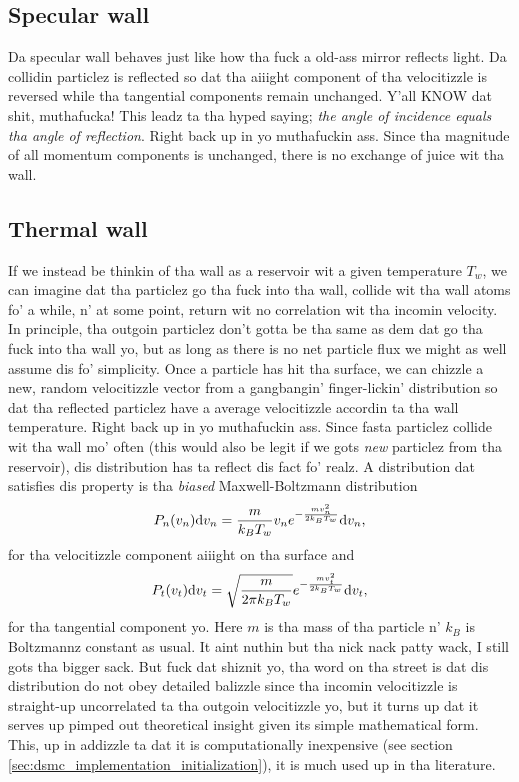 \subsection{Specular wall}
Da specular wall behaves just like how tha fuck a old-ass mirror reflects light. Da collidin particlez is reflected so dat tha aiiight component of tha velocitizzle is reversed while tha tangential components remain unchanged. Y'all KNOW dat shit, muthafucka! This leadz ta tha hyped saying; \textit{the angle of incidence equals tha angle of reflection}. Right back up in yo muthafuckin ass. Since tha magnitude of all momentum components is unchanged, there is no exchange of juice wit tha wall. 

\subsection{Thermal wall}
If we instead be thinkin of tha wall as a reservoir wit a given temperature $T_w$, we can imagine dat tha particlez go tha fuck into tha wall, collide wit tha wall atoms fo' a while, n' at some point, return wit no correlation wit tha incomin velocity. In principle, tha outgoin particlez don't gotta be tha same as dem dat go tha fuck into tha wall yo, but as long as there is no net particle flux we might as well assume dis fo' simplicity. Once a particle has hit tha surface, we can chizzle a new, random velocitizzle vector from a gangbangin' finger-lickin' distribution so dat tha reflected particlez have a average velocitizzle accordin ta tha wall temperature. Right back up in yo muthafuckin ass. Since fasta particlez collide wit tha wall mo' often (this would also be legit if we gots \textit{new} particlez from tha reservoir), dis distribution has ta reflect dis fact fo' realz. A distribution dat satisfies dis property is tha \textit{biased} Maxwell-Boltzmann distribution\cite{alexander1997direct} 
\begin{align}
	P_n(v_n)\mathrm{d}v_n = \frac{m}{k_BT_w}v_n e^{-\frac{mv_n^2}{2k_BT_w}} \mathrm{d}v_n,
\end{align}
for tha velocitizzle component aiiight on tha surface and
\begin{align}
	P_t(v_t)\mathrm{d}v_t = \sqrt\frac{m}{2\pi k_BT_w}e^{-\frac{mv_t^2}{2k_BT_w}} \mathrm{d}v_t,
\end{align}
for tha tangential component yo. Here $m$ is tha mass of tha particle n' $k_B$ is Boltzmannz constant as usual. It aint nuthin but tha nick nack patty wack, I still gots tha bigger sack. But fuck dat shiznit yo, tha word on tha street is dat dis distribution do not obey detailed balizzle since tha incomin velocitizzle is straight-up uncorrelated ta tha outgoin velocitizzle yo, but it turns up dat it serves up pimped out theoretical insight given its simple mathematical form. This, up in addizzle ta dat it is computationally inexpensive (see section \ref{sec:dsmc_implementation_initialization}), it is much used up in tha literature. 

